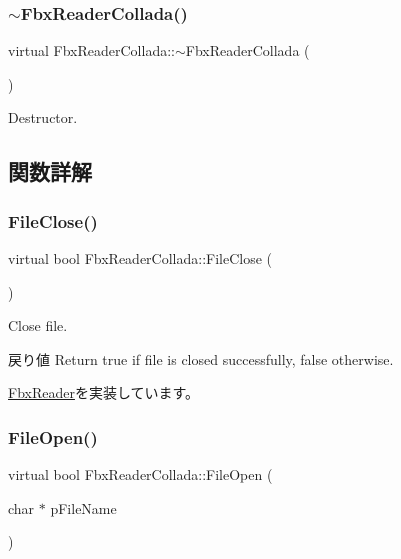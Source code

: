 \subsubsection{\texorpdfstring{$\sim$\+Fbx\+Reader\+Collada()}{~FbxReaderCollada()}}
{\footnotesize\ttfamily virtual Fbx\+Reader\+Collada\+::$\sim$\+Fbx\+Reader\+Collada (\begin{DoxyParamCaption}{ }\end{DoxyParamCaption})\hspace{0.3cm}{\ttfamily [virtual]}}



Destructor. 



\subsection{関数詳解}
\mbox{\label{class_fbx_reader_collada_a5668036ed12534fd339f3106c0d09864}} 
\subsubsection{\texorpdfstring{File\+Close()}{FileClose()}}
{\footnotesize\ttfamily virtual bool Fbx\+Reader\+Collada\+::\+File\+Close (\begin{DoxyParamCaption}{ }\end{DoxyParamCaption})\hspace{0.3cm}{\ttfamily [virtual]}}

Close file. \begin{DoxyReturn}{戻り値}
Return true if file is closed successfully, false otherwise. 
\end{DoxyReturn}


\hyperlink{class_fbx_reader_a327df94e5c24315fc5cbcedf0e7bb615}{Fbx\+Reader}を実装しています。

\mbox{\label{class_fbx_reader_collada_aec7a5267f85187eeb26dd55ec250119e}} 
\subsubsection{\texorpdfstring{File\+Open()}{FileOpen()}}
{\footnotesize\ttfamily virtual bool Fbx\+Reader\+Collada\+::\+File\+Open (\begin{DoxyParamCaption}\item[{char $\ast$}]{p\+File\+Name }\end{DoxyParamCaption})\hspace{0.3cm}{\ttfamily [virtual]}}

